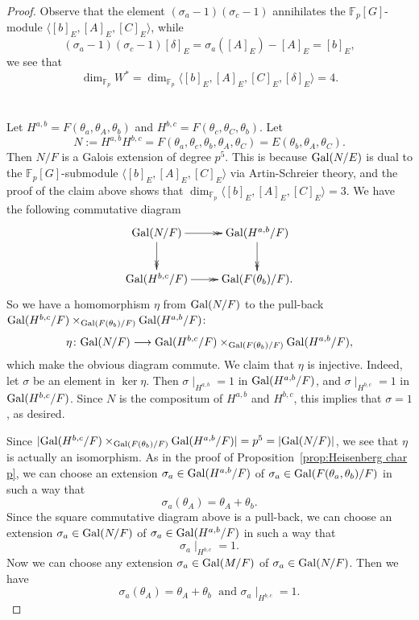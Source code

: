 \documentclass[12pt,leqno]{amsart}
\theoremstyle{plain}
\theoremstyle{definition}
\newcommand{\F}{{\mathbb F}}
\begin{document}
\begin{proof}
Observe that the element $(\sigma_a-1)(\sigma_c-1)$ annihilates the $\F_p[G]$-module $\langle [b]_E,[A]_E,[C]_E\rangle$, while 
\[
(\sigma_a-1)(\sigma_c-1)[\delta]_E= \sigma_a([A]_E)-[A]_E= [b]_E,
\]
we see that
\[
\dim_{\F_p}W^*=\dim_{\F_p}\langle [b]_E,[A]_E,[C]_E,[\delta]_E\rangle =4.
\]
\\
\\
Let $H^{a,b}=F(\theta_{a},\theta_{A},\theta_{b})$ and $H^{b,c}=F(\theta_{c},\theta_{C},\theta_{b})$. 
Let 
\[N:=H^{a,b}H^{b,c}=F(\theta_a,\theta_{c},\theta_{b},\theta_{A},\theta_{C})=E(\theta_{b},\theta_{A},\theta_{C}).\] 
Then $N/F$ is a Galois extension of degree $p^5$. 
This is because  ${\rm Gal}(N/E)$ is dual to the $\F_p[G]$-submodule $\langle  [b]_E,[A]_E,[C]_E \rangle$ via Artin-Schreier theory, 
and the proof of the claim above shows that $\dim_{\F_p}\langle [b]_E,[A]_E,[C]_E\rangle =3$. We have the following commutative diagram
\[
\xymatrix{
{\rm Gal}(N/F) \ar@{->>}[r] \ar@{->>}[d] & {\rm Gal}(H^{a,b}/F) \ar@{->>}[d]\\
{\rm Gal}(H^{b,c}/F) \ar@{->>}[r] & {\rm Gal}(F(\theta_{b})/F).
}
\]
So we have a homomorphism $\eta$ from ${\rm Gal}(N/F)$ to the pull-back ${\rm Gal}(H^{b,c}/F)\times_{{\rm Gal}(F(\theta_{b})/F)} {\rm Gal}(H^{a,b}/F)$:
\[
\eta\colon {\rm Gal}(N/F) \longrightarrow {\rm Gal}(H^{b,c}/F)\times_{{\rm Gal}(F(\theta_{b})/F)} {\rm Gal}(H^{a,b}/F),
\]
which make the obvious diagram commute.
We claim that $\eta$ is injective. Indeed, let $\sigma$ be an element in $\ker\eta$. Then $\sigma\mid_{H^{a,b}}=1$ in ${\rm Gal}(H^{a,b}/F)$, and $\sigma\mid_{H^{b,c}}=1$ in ${\rm Gal}(H^{b,c}/F)$. Since $N$ is the compositum of $H^{a,b}$ and $H^{b,c}$, this implies that $\sigma=1$, as desired. 

Since $|{\rm Gal}(H^{b,c}/F)\times_{{\rm Gal}(F(\theta_{b})/F)} {\rm Gal}(H^{a,b}/F)|=p^5=|{\rm Gal}(N/F)|$, we see that $\eta$ is actually an isomorphism.
As in the proof of Proposition~\ref{prop:Heisenberg char p}, we can choose an extension $\sigma_a\in {\rm Gal}(H^{a,b}/F)$ of $\sigma_a\in {\rm Gal}(F(\theta_{a},\theta_{b})/F)$ in such a way that 
\[
\sigma_a(\theta_{A})= \theta_{A}+\theta_{b}.
\]
Since the square commutative diagram above is a pull-back, we can choose an extension  $\sigma_a\in {\rm Gal}(N/F)$ of $\sigma_a\in {\rm Gal}(H^{a,b}/F)$ in such a way that
\[
 \sigma_a\mid_{H^{b,c}}=1.
\]
Now we can choose any extension $\sigma_a\in {\rm Gal}(M/F)$ of $\sigma_a\in{\rm Gal}(N/F)$. Then we have
\[
\sigma_a(\theta_{A})= \theta_{A}+\theta_{b} \; \text{ and }  \sigma_a\mid_{H^{b,c}}=1.
\]


\end{proof}
\end{document}
